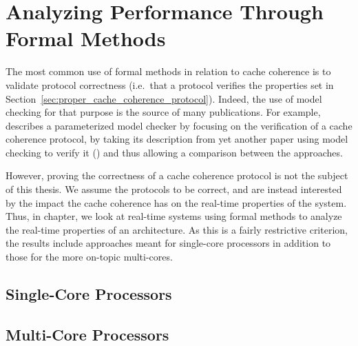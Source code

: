 \chapter{Analyzing Performance Through Formal Methods}
\label{cha:analyzing_rel_work}
The most common use of formal methods in relation to cache coherence is to
validate protocol correctness (i.e.~that a protocol verifies the properties set
in Section~\ref{sec:proper_cache_coherence_protocol}).  Indeed, the use of model
checking for that purpose is the source of many publications. For example,
\cite{conchon13jfla} describes a parameterized model checker by focusing on the
verification of a cache coherence protocol, by taking its description from yet
another paper using model checking to verify it (\cite{Baukus2002}) and thus
allowing a comparison between the approaches.

However, proving the correctness of a cache coherence protocol is not the
subject of this thesis. We assume the protocols to be correct, and are instead
interested by the impact the cache coherence has on the real-time properties
of the system. Thus, in chapter, we look at real-time systems using
formal methods to analyze the real-time properties of an architecture. As this
is a fairly restrictive criterion, the results include approaches meant for
single-core processors in addition to those for the more on-topic multi-cores.

\section{Single-Core Processors}



\section{Multi-Core Processors}




